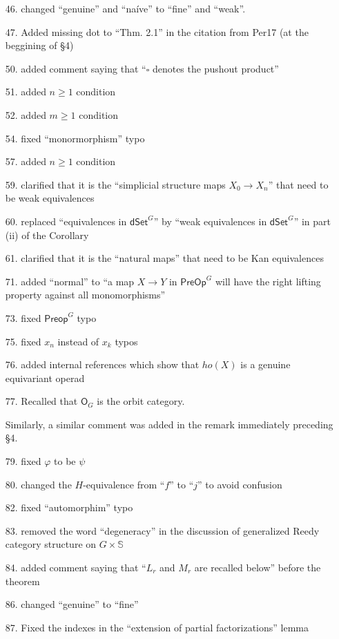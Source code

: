 \documentclass{article}
\begin{document}
\begin{itemize}
\item[46.] changed ``genuine'' and ``na\'ive'' to ``fine'' and ``weak''.
\item[47.] Added missing dot to ``Thm. 2.1'' in the citation from Per17 (at the beggining of \S 4)
\item[50.] added comment saying that ``$\square$ denotes the pushout product''
\item[51.] added $n \geq 1$ condition
\item[52.] added $m \geq 1$ condition
\item[54.] fixed ``monormorphism'' typo
\item[57.] added $n \geq 1$ condition
\item[59.] clarified that it is the ``simplicial structure maps $X_0 \to X_n$'' that need to be weak equivalences
\item[60.] replaced ``equivalences in $\mathsf{dSet}^G$'' by ``weak equivalences in $\mathsf{dSet}^G$'' in part (ii) of the Corollary
\item[61.] clarified that it is the ``natural maps'' that need to be Kan equivalences
\item[71.] added ``normal'' to ``a map $X\to Y$ in $\mathsf{PreOp}^G$ will have the right lifting property against all monomorphisms''
\item[73.] fixed $\mathsf{Preop}^G$ typo
\item[75.] fixed $x_n$ instead of $x_k$ typos
\item[76.] added internal references which show that $ho(X)$ is a genuine equivariant operad
\item[77.] Recalled that $\mathsf{O}_G$ is the orbit category.

Similarly, a similar comment was added in the remark immediately preceding \S 4.
\item[79.] fixed $\varphi$ to be $\psi$
\item[80.] changed the $H$-equivalence from ``$f$'' to ``$j$'' to avoid confusion
\item[82.] fixed ``automorphim'' typo
\item[83.] removed the word ``degeneracy'' in the discussion of generalized Reedy category structure on $G \times \mathbb{S}$
\item[84.] added comment saying that ``$L_r$ and $M_r$ are recalled below'' before the theorem
\item[86.] changed ``genuine'' to ``fine''
\item[87.] Fixed the indexes in the ``extension of partial factorizations'' lemma
\end{itemize}
\end{document}
